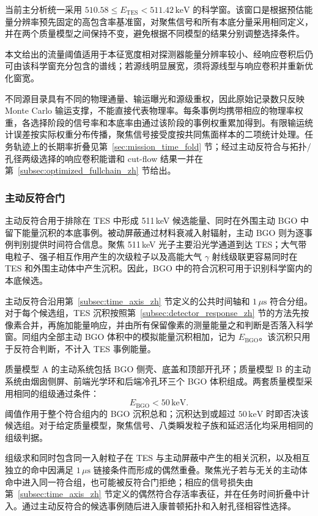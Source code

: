 \documentclass[11pt]{article}
\newcommand{\revblue}[1]{\textcolor{revisionblue}{#1}}
\newcommand{\keV}{\,\mathrm{keV}}
\begin{document}
当前主分析统一采用 $510.58\le E_{\mathrm{TES}}<511.42\keV$ 的科学窗。该窗口是根据预估能量分辨率预先固定的高包含率基准窗，对聚焦信号和所有本底分量采用相同定义，并在两个质量模型之间保持不变，避免根据不同模型的结果分别调整选择条件。

本文给出的流量阈值适用于本征宽度相对探测器能量分辨率较小、经响应卷积后仍可由该科学窗充分包含的谱线；若源线明显展宽，须将源线型与响应卷积并重新优化窗宽。

不同源目录具有不同的物理通量、输运曝光和源级重权，因此原始记录数只反映 Monte Carlo 输运支撑，不能直接代表物理率。每条事例均携带相应的物理率权重，各选择阶段的信号率和本底率由通过该阶段的事例权重累加得到。有限输运统计误差按实际权重分布传播，聚焦信号接受度按共同焦面样本的二项统计处理。任务轨迹上的长期率折叠见第~\ref{sec:mission_time_fold} 节；经过主动反符合与拓扑/孔径两级选择的响应卷积能谱和 cut-flow 结果一并在第~\ref{subsec:optimized_fullchain_zh} 节给出。

\subsubsection{主动反符合门}

主动反符合用于排除在 TES 中形成 511\,keV 候选能量、同时在外围主动 BGO 中留下能量沉积的本底事例。被动屏蔽通过材料衰减入射辐射，主动 BGO 则为逐事例判别提供时间符合信息。聚焦 511\,keV 光子主要沿光学通道到达 TES；大气带电粒子、强子相互作用产生的次级粒子以及\revblue{高能大气 $\gamma$ 射线级联}更容易同时在 TES 和外围主动体中产生沉积。因此，BGO 中的符合沉积可用于识别科学窗内的本底候选。

主动反符合沿用第~\ref{subsec:time_axis_zh} 节定义的公共时间轴和 $1\,\mu\mathrm{s}$ 符合分组。对于每个候选组，TES 沉积按照第~\ref{subsec:detector_response_zh} 节的方法先按像素合并，再施加能量响应，并由所有保留像素的测量能量之和判断是否落入科学窗。同组内全部主动 BGO 体积中的模拟能量沉积相加，记为 $E_{\mathrm{BGO}}$。该沉积只用于反符合判断，不计入 TES 事例能量。

质量模型 A 的主动系统包括 BGO 侧壳、底盖和顶部开孔环；质量模型 B 的主动系统由烟囱侧屏、前端光学环和后端冷孔环三个 BGO 体积组成。两套质量模型采用相同的组级通过条件：
\[
 E_{\mathrm{BGO}}<50\keV .
\]
阈值作用于整个符合组内的 BGO 沉积总和；沉积达到或超过 $50\keV$ 时即否决该候选组。对于给定质量模型，聚焦信号、\revblue{八类瞬发粒子族和延迟活化}均采用相同的组级判据。

组级求和同时包含同一入射粒子在 TES 与主动屏蔽中产生的相关沉积，以及相互独立的命中因满足 $1\,\mu\mathrm{s}$ 链接条件而形成的偶然重叠。聚焦光子若与无关的主动体命中进入同一符合组，也可能被反符合门拒绝；相应的信号损失由第~\ref{subsec:time_axis_zh} 节定义的偶然符合存活率表征，并在任务时间折叠中计入。通过主动反符合的候选事例随后进入康普顿拓扑和入射孔径相容性选择。
\end{document}
